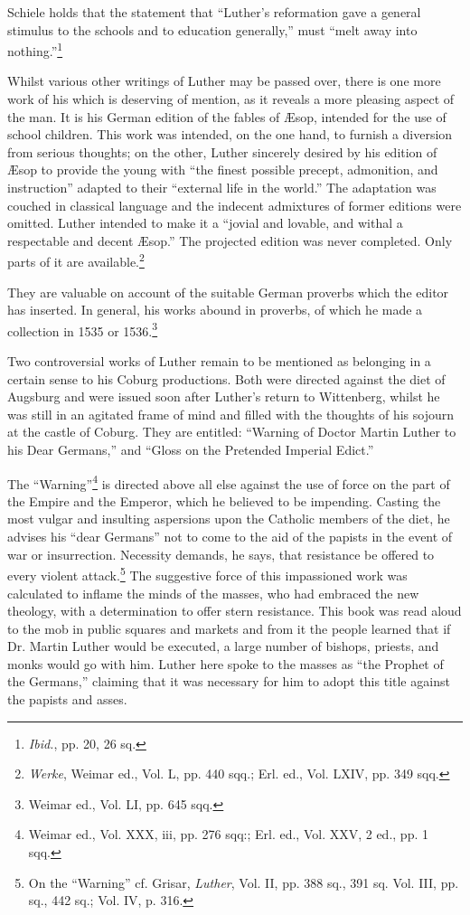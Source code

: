 Schiele holds that the statement that “Luther’s reformation gave a general
stimulus to the schools and to education generally,” must “melt away
into nothing.”\footnote{\textit{Ibid.}, pp. 20, 26 sq.}

Whilst various other writings of Luther may be passed over, there
is one more work of his which is deserving of mention, as it reveals
a more pleasing aspect of the man. It is his German edition of the
fables of Æsop, intended for the use of school children. This work
was intended, on the one hand, to furnish a diversion from serious
thoughts; on the other, Luther sincerely desired by his edition of
Æsop to provide the young with “the finest possible precept, admonition,
and instruction” adapted to their “external life in the world.”
The adaptation was couched in classical language and the indecent
admixtures of former editions were omitted. Luther intended to make
it a “jovial and lovable, and withal a respectable and decent Æsop.”
The projected edition was never completed. Only parts of it are
available.\footnote{\textit{Werke}, Weimar ed., Vol. L, pp. 440 sqq.; Erl. ed., Vol. LXIV, pp. 349 sqq.}

They are valuable on account of the suitable German
proverbs which the editor has inserted. In general, his works abound
in proverbs, of which he made a collection in 1535 or 1536.\footnote{Weimar ed., Vol. LI, pp. 645 sqq.}

Two controversial works of Luther remain to be mentioned as belonging
in a certain sense to his Coburg productions. Both were directed against
the diet of Augsburg and were issued soon after Luther’s return to Wittenberg,
whilst he was still in an agitated frame
of mind and filled with the thoughts of his sojourn at the castle of
Coburg. They are entitled: “Warning of Doctor Martin Luther to
his Dear Germans,” and “Gloss on the Pretended Imperial Edict.”

The “Warning”\footnote{Weimar ed., Vol. XXX, iii, pp. 276 sqq:; Erl. ed., Vol. XXV, 2 ed., pp. 1 sqq.}
is directed above all else against the use of force
on the part of the Empire and the Emperor, which he believed to be
impending. Casting the most vulgar and insulting aspersions upon
the Catholic members of the diet, he advises his “dear Germans” not
to come to the aid of the papists in the event of war or insurrection.
Necessity demands, he says, that resistance be offered to every violent
attack.\footnote{On the “Warning” cf. Grisar, \textit{Luther}, Vol. II, pp. 388 sq., 391 sq. Vol. III, pp. sq.,
442 sq.; Vol. IV, p. 316.}
The suggestive force of this impassioned work was calculated
to inflame the minds of the masses, who had embraced the new
theology, with a determination to offer stern resistance. This book
was read aloud to the mob in public squares and markets and from it
the people learned that if Dr. Martin Luther would be executed, a
large number of bishops, priests, and monks would go with him.
Luther here spoke to the masses as “the Prophet of the Germans,”
claiming that it was necessary for him to adopt this title against the
papists and asses.

